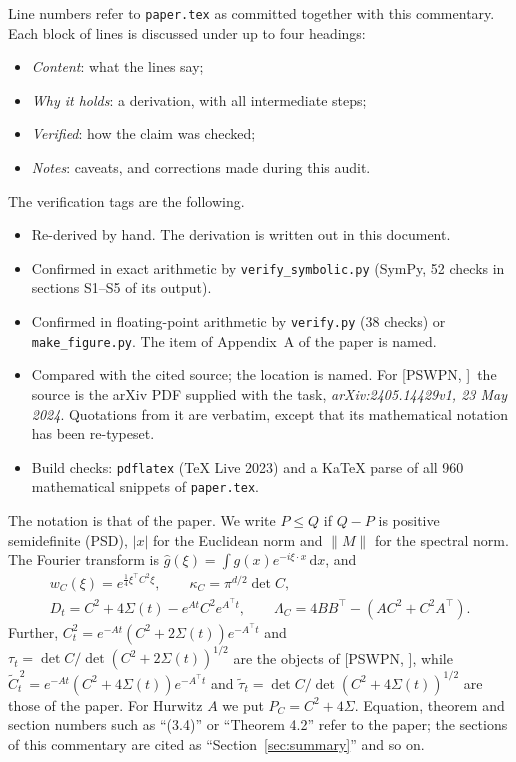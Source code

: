 \documentclass[11pt]{amsart}
\newcommand{\dd}{\,\mathrm{d}}
\newcommand{\Ct}{\widetilde{C}_t}
\newcommand{\taut}{\widetilde{\tau}_t}
\newcommand{\hatf}[1]{\widehat{#1}}
\newcommand{\tp}{\top}
\newcommand{\tA}{\textsf{A}}
\newcommand{\tS}{\textsf{S}}
\newcommand{\tN}{\textsf{N}}
\newcommand{\tL}{\textsf{L}}
\newcommand{\tB}{\textsf{B}}
\newcommand{\file}[1]{\texttt{#1}}
\newcommand{\PS}[1][]{[PSWPN\ifx\relax#1\relax\else, #1\fi]}
\begin{document}
Line numbers refer to \file{paper.tex} as committed together with this commentary. Each block of lines is discussed
under up to four headings:
\begin{itemize}
\item \emph{Content}: what the lines say;
\item \emph{Why it holds}: a derivation, with all intermediate steps;
\item \emph{Verified}: how the claim was checked;
\item \emph{Notes}: caveats, and corrections made during this audit.
\end{itemize}
The verification tags are the following.
\begin{itemize}
\item[\tA] Re-derived by hand. The derivation is written out in this document.
\item[\tS] Confirmed in exact arithmetic by \file{verify\_symbolic.py} (SymPy, 52 checks in sections S1--S5 of its
output).
\item[\tN] Confirmed in floating-point arithmetic by \file{verify.py} (38 checks) or \file{make\_figure.py}. The item
of Appendix~A of the paper is named.
\item[\tL] Compared with the cited source; the location is named. For \PS\ the source is the arXiv PDF supplied with
the task, \emph{arXiv:2405.14429v1, 23 May 2024}. Quotations from it are verbatim, except that its mathematical
notation has been re-typeset.
\item[\tB] Build checks: \file{pdflatex} (TeX Live 2023) and a KaTeX parse of all 960 mathematical snippets of
\file{paper.tex}.
\end{itemize}
The notation is that of the paper. We write $P\le Q$ if $Q-P$ is positive semidefinite (PSD), $|x|$ for the Euclidean
norm and $\|M\|$ for the spectral norm. The Fourier transform is $\hatf g(\xi)=\int g(x)e^{-i\xi\cdot x}\dd x$, and
\begin{gather*}
w_C(\xi)=e^{\frac14\xi^\tp C^2\xi},\qquad\kappa_C=\pi^{d/2}\det C,\\
D_t=C^2+4\Sigma(t)-e^{At}C^2e^{A^\tp t},\qquad\Lambda_C=4BB^\tp-(AC^2+C^2A^\tp).
\end{gather*}
Further, $C_t^2=e^{-At}(C^2+2\Sigma(t))e^{-A^\tp t}$ and $\tau_t=\det C/\det(C^2+2\Sigma(t))^{1/2}$ are the objects
of \PS, while $\Ct^{\,2}=e^{-At}(C^2+4\Sigma(t))e^{-A^\tp t}$ and $\taut=\det C/\det(C^2+4\Sigma(t))^{1/2}$ are those
of the paper. For Hurwitz $A$ we put $P_C=C^2+4\Sigma$. Equation, theorem and section numbers such as ``(3.4)'' or
``Theorem 4.2'' refer to the paper; the sections of this commentary are cited as ``Section~\ref{sec:summary}'' and so
on.
\end{document}
